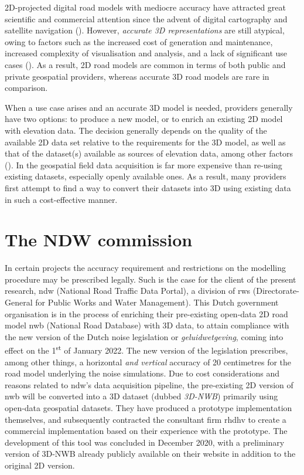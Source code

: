 2D-projected digital road models with mediocre accuracy have attracted great scientific and commercial attention since the advent of digital cartography and satellite navigation (\cite{taylor_etal_2001, fouque_bonnifait_2008, yue_etal_2008}). However, \textit{accurate 3D representations} are still atypical, owing to factors such as the increased cost of generation and maintenance, increased complexity of visualisation and analysis, and a lack of significant use cases (\cite{zhu_li_2007, wang_etal_2014}). As a result, 2D road models are common in terms of both public and private geospatial providers, whereas accurate 3D road models are rare in comparison.

When a use case arises and an accurate 3D model is needed, providers generally have two options: to produce a new model, or to enrich an existing 2D model with elevation data. The decision generally depends on the quality of the available 2D data set relative to the requirements for the 3D model, as well as that of the dataset(s) available as sources of elevation data, among other factors (\cite{zhu_li_2007, zhu_li_2008, wang_etal_2014}). In the geospatial field data acquisition is far more expensive than re-using existing datasets, especially openly available ones. As a result, many providers first attempt to find a way to convert their datasets into 3D using existing data in such a cost-effective manner.

\section{The NDW commission}
\label{sec:commission}

In certain projects the accuracy requirement and restrictions on the modelling procedure may be prescribed legally. Such is the case for the client of the present research, \ac{ndw} (National Road Traffic Data Portal), a division of \ac{rws} (Directorate-General for Public Works and Water Management). This Dutch government organisation is in the process of enriching their pre-existing open-data 2D road model \ac{nwb} (National Road Database) with 3D data, to attain compliance with the new version of the Dutch noise legislation or \textit{geluidwetgeving}, coming into effect on the 1\textsuperscript{st} of January 2022. The new version of the legislation prescribes, among other things, a horizontal \textit{and vertical} accuracy of 20 centimetres for the road model underlying the noise simulations. Due to cost considerations and reasons related to \ac{ndw}’s data acquisition pipeline, the pre-existing 2D version of \ac{nwb} will be converted into a 3D dataset (dubbed \textit{3D-NWB}) primarily using open-data geospatial datasets. They have produced a prototype implementation themselves, and subsequently contracted the consultant firm \ac{rhdhv} to create a commercial implementation based on their experience with the prototype. The development of this tool was concluded in December 2020, with a preliminary version of 3D-NWB already publicly available on their website in addition to the original 2D version.

